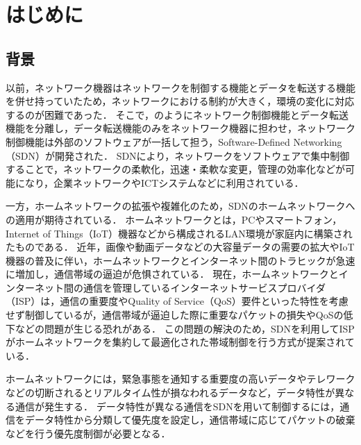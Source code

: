 \documentclass[a4paper,11pt,uplatex]{ujreport}
\begin{document}
\tableofcontents

\clearpage


\chapter{はじめに}
\label{chap:Introduction}


\section{背景}
\label{sec:背景}


  以前，ネットワーク機器はネットワークを制御する機能とデータを転送する機能を併せ持っていたため，ネットワークにおける制約が大きく，環境の変化に対応するのが困難であった．
  そこで，のようにネットワーク制御機能とデータ転送機能を分離し，データ転送機能のみをネットワーク機器に担わせ，ネットワーク制御機能は外部のソフトウェアが一括して担う，Software-Defined Networking（SDN）が開発された．
  SDNにより，ネットワークをソフトウェアで集中制御することで，ネットワークの柔軟化，迅速・柔軟な変更，管理の効率化などが可能になり，企業ネットワークやICTシステムなどに利用されている\cite{NEC}．\par
  一方，ホームネットワークの拡張や複雑化のため，SDNのホームネットワークへの適用が期待されている．
  ホームネットワークとは，PCやスマートフォン，Internet of Things（IoT）機器などから構成されるLAN環境が家庭内に構築されたものである．
  近年，画像や動画データなどの大容量データの需要の拡大やIoT機器の普及に伴い，ホームネットワークとインターネット間のトラヒックが急速に増加し，通信帯域の逼迫が危惧されている\cite{ガイドライン}．
  現在，ホームネットワークとインターネット間の通信を管理しているインターネットサービスプロバイダ（ISP）は，通信の重要度やQuality of Service（QoS）要件といった特性を考慮せず制御しているが，通信帯域が逼迫した際に重要なパケットの損失やQoSの低下などの問題が生じる恐れがある．
  この問題の解決のため，SDNを利用してISPがホームネットワークを集約して最適化された帯域制御を行う方式が提案されている\cite{Framework}．\par
  ホームネットワークには，緊急事態を通知する重要度の高いデータやテレワークなどの切断されるとリアルタイム性が損なわれるデータなど，データ特性が異なる通信が発生する．
  データ特性が異なる通信をSDNを用いて制御するには，通信をデータ特性から分類して優先度を設定し，通信帯域に応じてパケットの破棄などを行う優先度制御が必要となる．
\end{document}
